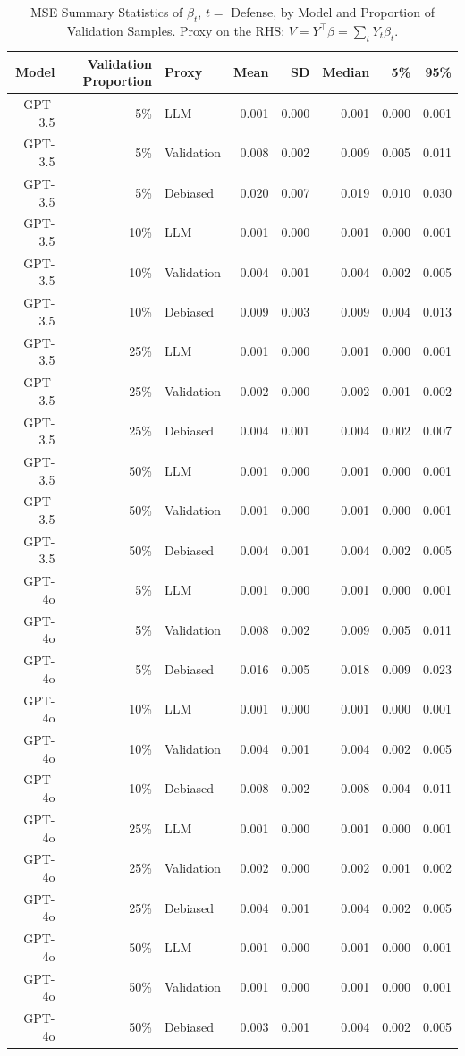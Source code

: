 \begin{table}

\caption{MSE Summary Statistics of $\beta_{t}$, $t=$ Defense, by Model and Proportion of Validation Samples. Proxy on the RHS: $V = Y^\top \beta = \sum_{t} Y_t \beta_t$.}
\centering
\begin{tabular}[t]{rrlrrrrr}
\toprule
Model & Validation Proportion & Proxy & Mean & SD & Median & 5\% & 95\%\\
\midrule
GPT-3.5 & 5\% & LLM & 0.001 & 0.000 & 0.001 & 0.000 & 0.001\\
GPT-3.5 & 5\% & Validation & 0.008 & 0.002 & 0.009 & 0.005 & 0.011\\
GPT-3.5 & 5\% & Debiased & 0.020 & 0.007 & 0.019 & 0.010 & 0.030\\
GPT-3.5 & 10\% & LLM & 0.001 & 0.000 & 0.001 & 0.000 & 0.001\\
GPT-3.5 & 10\% & Validation & 0.004 & 0.001 & 0.004 & 0.002 & 0.005\\
GPT-3.5 & 10\% & Debiased & 0.009 & 0.003 & 0.009 & 0.004 & 0.013\\
GPT-3.5 & 25\% & LLM & 0.001 & 0.000 & 0.001 & 0.000 & 0.001\\
GPT-3.5 & 25\% & Validation & 0.002 & 0.000 & 0.002 & 0.001 & 0.002\\
GPT-3.5 & 25\% & Debiased & 0.004 & 0.001 & 0.004 & 0.002 & 0.007\\
GPT-3.5 & 50\% & LLM & 0.001 & 0.000 & 0.001 & 0.000 & 0.001\\
GPT-3.5 & 50\% & Validation & 0.001 & 0.000 & 0.001 & 0.000 & 0.001\\
GPT-3.5 & 50\% & Debiased & 0.004 & 0.001 & 0.004 & 0.002 & 0.005\\
GPT-4o & 5\% & LLM & 0.001 & 0.000 & 0.001 & 0.000 & 0.001\\
GPT-4o & 5\% & Validation & 0.008 & 0.002 & 0.009 & 0.005 & 0.011\\
GPT-4o & 5\% & Debiased & 0.016 & 0.005 & 0.018 & 0.009 & 0.023\\
GPT-4o & 10\% & LLM & 0.001 & 0.000 & 0.001 & 0.000 & 0.001\\
GPT-4o & 10\% & Validation & 0.004 & 0.001 & 0.004 & 0.002 & 0.005\\
GPT-4o & 10\% & Debiased & 0.008 & 0.002 & 0.008 & 0.004 & 0.011\\
GPT-4o & 25\% & LLM & 0.001 & 0.000 & 0.001 & 0.000 & 0.001\\
GPT-4o & 25\% & Validation & 0.002 & 0.000 & 0.002 & 0.001 & 0.002\\
GPT-4o & 25\% & Debiased & 0.004 & 0.001 & 0.004 & 0.002 & 0.005\\
GPT-4o & 50\% & LLM & 0.001 & 0.000 & 0.001 & 0.000 & 0.001\\
GPT-4o & 50\% & Validation & 0.001 & 0.000 & 0.001 & 0.000 & 0.001\\
GPT-4o & 50\% & Debiased & 0.003 & 0.001 & 0.004 & 0.002 & 0.005\\
\bottomrule
\end{tabular}
\end{table}
